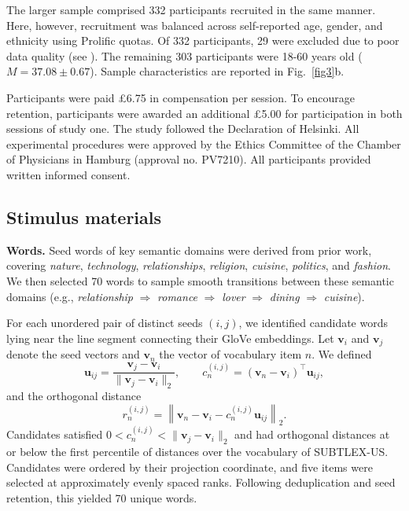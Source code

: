 \documentclass[pdflatex,sn-mathphys]{sn-jnl}
\begin{document}
The larger sample comprised 332 participants recruited in the same manner. Here, however, recruitment was balanced across self-reported age, gender, and ethnicity using Prolific quotas. Of 332 participants, 29 were excluded due to poor data quality (see ). The remaining 303 participants were 18-60 years old ($M = 37.08\pm0.67$). Sample characteristics are reported in Fig.~\ref{fig3}b.

Participants were paid £6.75 in compensation per session. To encourage retention, participants were awarded an additional £5.00 for participation in both sessions of study one. The study followed the Declaration of Helsinki. All experimental procedures were approved by the Ethics Committee of the Chamber of Physicians in Hamburg (approval no. PV7210). All participants provided written informed consent.

\subsection{Stimulus materials}\label{materials}
\textbf{Words.} Seed words of key semantic domains were derived from prior work\cite{Schneider2026,WordNetDomains}, covering \textit{nature}, \textit{technology}, \textit{relationships}, \textit{religion}, \textit{cuisine}, \textit{politics}, and \textit{fashion}. We then selected 70 words to sample smooth transitions between these semantic domains (e.g., \textit{relationship} $\Rightarrow$ \textit{romance} $\Rightarrow$ \textit{lover} $\Rightarrow$ \textit{dining} $\Rightarrow$ \textit{cuisine}).

For each unordered pair of distinct seeds $(i, j)$, we identified candidate words lying near the line segment connecting their GloVe\cite{glove} embeddings. Let $\mathbf{v}_i$ and $\mathbf{v}_j$ denote the seed vectors and $\mathbf{v}_n$ the vector of vocabulary item $n$. We defined
\begin{equation*}
    \mathbf{u}_{ij} =\frac{\mathbf{v}_j - \mathbf{v}_i}{\lVert\mathbf{v}_j-\mathbf{v}_i\rVert_2},
    \qquad
    c_n^{(i,j)} = (\mathbf{v}_n - \mathbf{v}_i)^\top\mathbf{u}_{ij},
\end{equation*}
and the orthogonal distance
\begin{equation*}
    r_n^{(i,j)}=\left\lVert\mathbf{v}_n - \mathbf{v}_i - c_n^{(i,j)}\mathbf{u}_{ij}\right\rVert_2.
\end{equation*}
Candidates satisfied $0 < c_n^{(i,j)} < \lVert\mathbf{v}_j - \mathbf{v}_i\rVert_2$ and had orthogonal distances at or below the first percentile of distances over the vocabulary of SUBTLEX-US\cite{SUBTLEX}. Candidates were ordered by their projection coordinate, and five items were selected at approximately evenly spaced ranks. Following deduplication and seed retention, this yielded 70 unique words.
\end{document}
